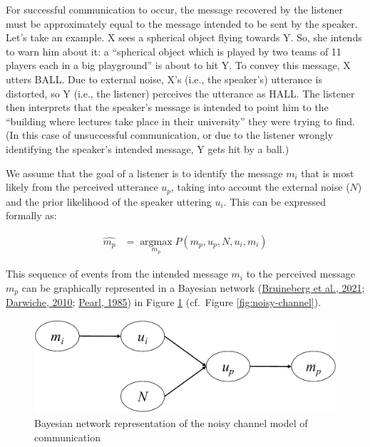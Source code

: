 \documentclass[a4paper, nobind]{templates/ociamthesis}
\begin{document}
For successful communication to occur, the message recovered by the listener must be approximately equal to the message intended to be sent by the speaker.
Let's take an example.
X sees a spherical object flying towards Y.
So, she intends to warn him about it: a ``spherical object which is played by two teams of 11 players each in a big playground'' is about to hit Y.
To convey this message, X utters BALL.
Due to external noise, X's (i.e., the speaker's) utterance is distorted, so Y (i.e., the listener) perceives the utterance as HALL.
The listener then interprets that the speaker's message is intended to point him to the ``building where lectures take place in their university'' they were trying to find.
(In this case of unsuccessful communication, or due to the listener wrongly identifying the speaker's intended message, Y gets hit by a ball.)

We assume that the goal of a listener is to identify the message \(m_i\) that is most likely from the perceived utterance \(u_p\), taking into account the external noise (\(N\)) and the prior likelihood of the speaker uttering \(u_i\).
This can be expressed formally as:

\begin{align} \label{eq:noisy-channel2}
\hat{m_p} &= \mathop{\mathrm{argmax}}\limits_{m_p} P(m_p,u_p,N,u_i,m_i)
\end{align}

This sequence of events from the intended message \(m_i\) to the perceived message \(m_p\) can be graphically represented in a Bayesian network (\protect\hyperlink{ref-Bruineberg2021}{Bruineberg et al., 2021}; \protect\hyperlink{ref-Darwiche2010}{Darwiche, 2010}; \protect\hyperlink{ref-Pearl1985}{Pearl, 1985}) in Figure \ref{fig:bayesian-network} (cf.~Figure \ref{fig:noisy-channel}).

\begin{figure}[!htpb]

{\centering \includegraphics[width=0.9\linewidth]{figures/materials/bayesian-network} 

}

\caption{Bayesian network representation of the noisy channel model of communication}\label{fig:bayesian-network}
\end{figure}
\end{document}
